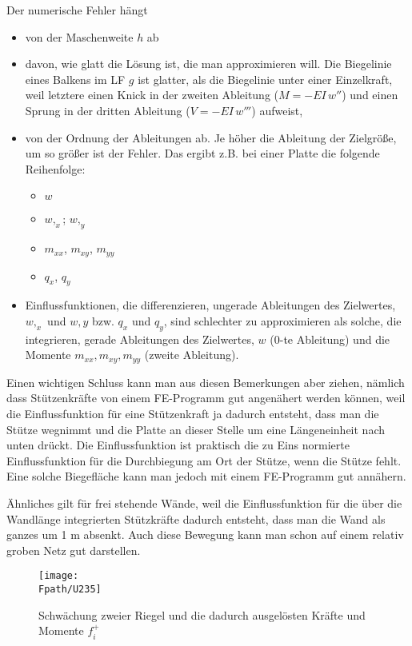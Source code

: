 {{{{Der numerische Fehler h\"{a}ngt
\begin{itemize}
  \item von der Maschenweite $h$ ab
  \item davon, wie glatt die L\"{o}sung ist, die man approximieren will. Die Biegelinie eines Balkens im LF $g$ ist glatter, als die Biegelinie unter einer Einzelkraft, weil letztere einen Knick in der zweiten Ableitung ($M = - EI\,w''$) und einen Sprung in der dritten Ableitung ($V = - EI\,w'''$) aufweist,
  \item von der Ordnung der Ableitungen ab. Je h\"{o}her die Ableitung der Zielgr\"{o}{\ss}e,  um so  gr\"{o}{\ss}er ist der Fehler. Das ergibt z.B. bei einer Platte die folgende Reihenfolge:
  \begin{itemize}
    \item $w$
    \item $w,_x$; $w,_y$
    \item $m_{xx}$, $m_{xy}$, $m_{yy}$
    \item $q_x$, $q_y$
  \end{itemize}
  \item Einflussfunktionen, die differenzieren, ungerade Ableitungen des Zielwertes, $w,_x$ und $w,y$ bzw. $q_x$ und $q_y$, sind schlechter zu approximieren als solche, die integrieren, gerade Ableitungen des Zielwertes, $w$  (0-te Ableitung) und die Momente $m_{xx}, m_{xy}, m_{yy}$ (zweite Ableitung).
\end{itemize}

Einen wichtigen Schluss kann man aus diesen Bemerkungen aber ziehen, n\"{a}mlich dass St\"{u}tzenkr\"{a}fte von einem FE-Programm gut angen\"{a}hert werden k\"{o}nnen, weil die Einflussfunktion f\"{u}r eine St\"{u}tzenkraft ja dadurch entsteht, dass man die St\"{u}tze wegnimmt und die Platte an dieser Stelle um eine L\"{a}ngeneinheit nach unten dr\"{u}ckt. Die Einflussfunktion ist praktisch die zu Eins normierte Einflussfunktion f\"{u}r die Durchbiegung am Ort der St\"{u}tze, wenn die St\"{u}tze fehlt. Eine solche Biegefl\"{a}che kann man jedoch mit einem FE-Programm gut ann\"{a}hern.

\"{A}hnliches gilt f\"{u}r frei stehende W\"{a}nde, weil die Einflussfunktion f\"{u}r die \"{u}ber die Wandl\"{a}nge integrierten St\"{u}tzkr\"{a}fte dadurch entsteht, dass man die Wand als ganzes um 1 m absenkt. Auch diese Bewegung kann man schon auf einem relativ groben Netz gut darstellen.




\begin{figure}[tbp]
\centering
\texttt{[image: \\Fpath/U235]}
\caption{Schw\"{a}chung zweier Riegel und die dadurch ausgel\"{o}sten Kr\"{a}fte und Momente $f_i^+$}
\label{U235}
%
\end{figure}%

}}}}
